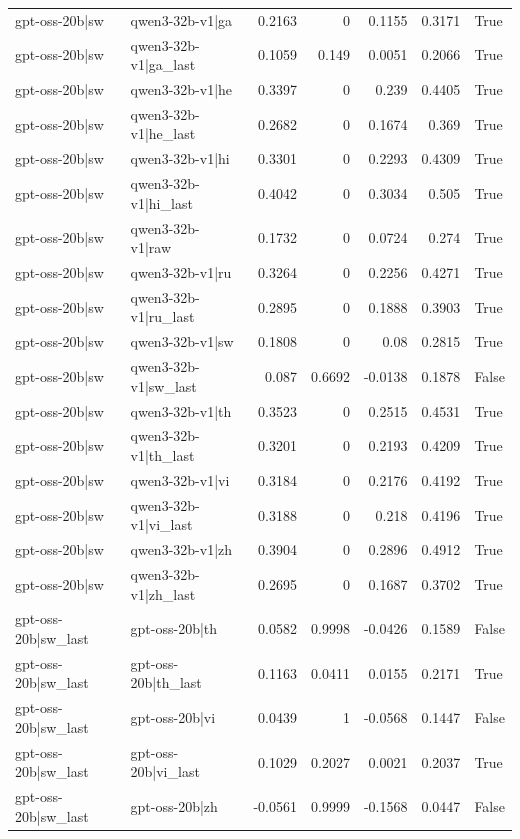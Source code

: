 \begin{table}
\begin{tabular}{l l r r r r l}
gpt-oss-20b|sw & qwen3-32b-v1|ga & 0.2163 & 0 & 0.1155 & 0.3171 & True \\
gpt-oss-20b|sw & qwen3-32b-v1|ga_last & 0.1059 & 0.149 & 0.0051 & 0.2066 & True \\
gpt-oss-20b|sw & qwen3-32b-v1|he & 0.3397 & 0 & 0.239 & 0.4405 & True \\
gpt-oss-20b|sw & qwen3-32b-v1|he_last & 0.2682 & 0 & 0.1674 & 0.369 & True \\
gpt-oss-20b|sw & qwen3-32b-v1|hi & 0.3301 & 0 & 0.2293 & 0.4309 & True \\
gpt-oss-20b|sw & qwen3-32b-v1|hi_last & 0.4042 & 0 & 0.3034 & 0.505 & True \\
gpt-oss-20b|sw & qwen3-32b-v1|raw & 0.1732 & 0 & 0.0724 & 0.274 & True \\
gpt-oss-20b|sw & qwen3-32b-v1|ru & 0.3264 & 0 & 0.2256 & 0.4271 & True \\
gpt-oss-20b|sw & qwen3-32b-v1|ru_last & 0.2895 & 0 & 0.1888 & 0.3903 & True \\
gpt-oss-20b|sw & qwen3-32b-v1|sw & 0.1808 & 0 & 0.08 & 0.2815 & True \\
gpt-oss-20b|sw & qwen3-32b-v1|sw_last & 0.087 & 0.6692 & -0.0138 & 0.1878 & False \\
gpt-oss-20b|sw & qwen3-32b-v1|th & 0.3523 & 0 & 0.2515 & 0.4531 & True \\
gpt-oss-20b|sw & qwen3-32b-v1|th_last & 0.3201 & 0 & 0.2193 & 0.4209 & True \\
gpt-oss-20b|sw & qwen3-32b-v1|vi & 0.3184 & 0 & 0.2176 & 0.4192 & True \\
gpt-oss-20b|sw & qwen3-32b-v1|vi_last & 0.3188 & 0 & 0.218 & 0.4196 & True \\
gpt-oss-20b|sw & qwen3-32b-v1|zh & 0.3904 & 0 & 0.2896 & 0.4912 & True \\
gpt-oss-20b|sw & qwen3-32b-v1|zh_last & 0.2695 & 0 & 0.1687 & 0.3702 & True \\
gpt-oss-20b|sw_last & gpt-oss-20b|th & 0.0582 & 0.9998 & -0.0426 & 0.1589 & False \\
gpt-oss-20b|sw_last & gpt-oss-20b|th_last & 0.1163 & 0.0411 & 0.0155 & 0.2171 & True \\
gpt-oss-20b|sw_last & gpt-oss-20b|vi & 0.0439 & 1 & -0.0568 & 0.1447 & False \\
gpt-oss-20b|sw_last & gpt-oss-20b|vi_last & 0.1029 & 0.2027 & 0.0021 & 0.2037 & True \\
gpt-oss-20b|sw_last & gpt-oss-20b|zh & -0.0561 & 0.9999 & -0.1568 & 0.0447 & False \\

\end{tabular}
\end{table}
